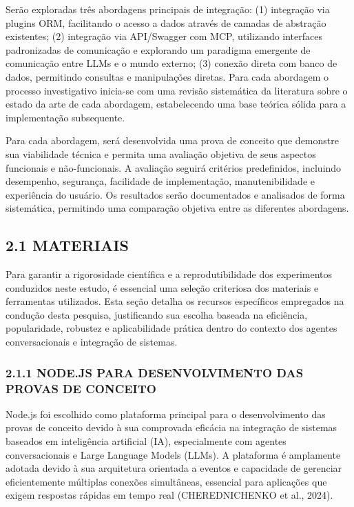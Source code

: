 \documentclass[
]{article}
\begin{document}
Serão exploradas três abordagens principais de integração: (1)
integração via plugins ORM, facilitando o acesso a dados através de
camadas de abstração existentes; (2) integração via API/Swagger com MCP,
utilizando interfaces padronizadas de comunicação e explorando um
paradigma emergente de comunicação entre LLMs e o mundo externo; (3)
conexão direta com banco de dados, permitindo consultas e manipulações
diretas. Para cada abordagem o processo investigativo inicia-se com uma
revisão sistemática da literatura sobre o estado da arte de cada
abordagem, estabelecendo uma base teórica sólida para a implementação
subsequente.

Para cada abordagem, será desenvolvida uma prova de conceito que
demonstre sua viabilidade técnica e permita uma avaliação objetiva de
seus aspectos funcionais e não-funcionais. A avaliação seguirá critérios
predefinidos, incluindo desempenho, segurança, facilidade de
implementação, manutenibilidade e experiência do usuário. Os resultados
serão documentados e analisados de forma sistemática, permitindo uma
comparação objetiva entre as diferentes abordagens.

\subsection{2.1 MATERIAIS}\label{materiais}

Para garantir a rigorosidade científica e a reprodutibilidade dos
experimentos conduzidos neste estudo, é essencial uma seleção criteriosa
dos materiais e ferramentas utilizados. Esta seção detalha os recursos
específicos empregados na condução desta pesquisa, justificando sua
escolha baseada na eficiência, popularidade, robustez e aplicabilidade
prática dentro do contexto dos agentes conversacionais e integração de
sistemas.

\subsubsection{2.1.1 NODE.JS PARA DESENVOLVIMENTO DAS PROVAS DE
CONCEITO}\label{node.js-para-desenvolvimento-das-provas-de-conceito}

Node.js foi escolhido como plataforma principal para o desenvolvimento
das provas de conceito devido à sua comprovada eficácia na integração de
sistemas baseados em inteligência artificial (IA), especialmente com
agentes conversacionais e Large Language Models (LLMs). A plataforma é
amplamente adotada devido à sua arquitetura orientada a eventos e
capacidade de gerenciar eficientemente múltiplas conexões simultâneas,
essencial para aplicações que exigem respostas rápidas em tempo real
(CHEREDNICHENKO et al., 2024).
\end{document}
